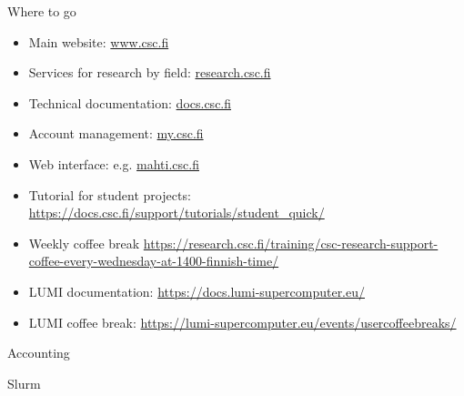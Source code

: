 \documentclass[aspectratio=54,10pt]{beamer}
\begin{document}
\begin{frame}{Where to go}
    \begin{itemize}
        \item Main website: \href{www.csc.fi}{www.csc.fi}
        \item Services for research by field: \href{research.csc.fi}{research.csc.fi}
        \item Technical documentation: \href{docs.csc.fi}{docs.csc.fi}
        \item Account management: \href{my.csc.fi}{my.csc.fi}
        \item Web interface: e.g. \href{mahti.csc.fi}{mahti.csc.fi}
        \item Tutorial for student projects: \href{https://docs.csc.fi/support/tutorials/student_quick/}{https://docs.csc.fi/support/tutorials/student\_quick/}
        \item Weekly coffee break \href{https://research.csc.fi/training/csc-research-support-coffee-every-wednesday-at-1400-finnish-time/}{https://research.csc.fi/training/csc-research-support-coffee-every-wednesday-at-1400-finnish-time/}
        \item LUMI documentation: \href{https://docs.lumi-supercomputer.eu/}{https://docs.lumi-supercomputer.eu/}
        \item LUMI coffee break: \href{https://lumi-supercomputer.eu/events/usercoffeebreaks/}{https://lumi-supercomputer.eu/events/usercoffeebreaks/}
    \end{itemize}
\end{frame}

\begin{frame}{Accounting}
\end{frame}

\begin{frame}{Slurm}
\end{frame}
\end{document}
